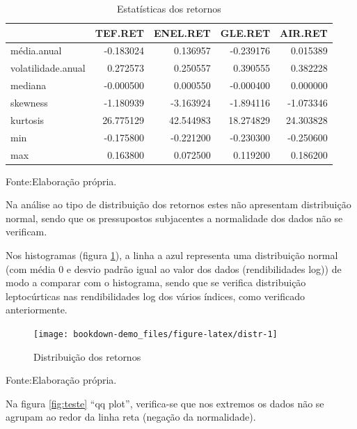\documentclass[
  12pt,
  a4paper,
  openany]{book}
\begin{document}
\begin{table}[!h]

\caption{\label{tab:statret}Estatísticas dos retornos}
\centering
\begin{tabular}[t]{lrrrr}
\toprule
  & TEF.RET & ENEL.RET & GLE.RET & AIR.RET\\
\midrule
média.anual & -0.183024 & 0.136957 & -0.239176 & 0.015389\\
volatilidade.anual & 0.272573 & 0.250557 & 0.390555 & 0.382228\\
mediana & -0.000500 & 0.000550 & -0.000400 & 0.000000\\
skewness & -1.180939 & -3.163924 & -1.894116 & -1.073346\\
kurtosis & 26.775129 & 42.544983 & 18.274829 & 24.303828\\
\addlinespace
min & -0.175800 & -0.221200 & -0.230300 & -0.250600\\
max & 0.163800 & 0.072500 & 0.119200 & 0.186200\\
\bottomrule
\end{tabular}
\end{table}
\FloatBarrier
\centering

Fonte:Elaboração própria.

\justifying
\bigskip

Na análise ao tipo de distribuição dos retornos estes não apresentam distribuição normal, sendo que os pressupostos subjacentes a normalidade dos dados não se verificam.

Nos histogramas (figura \ref{fig:distr}), a linha a azul representa uma distribuição normal (com média 0 e desvio padrão igual ao valor dos dados (rendibilidades log)) de modo a comparar com o histograma, sendo que se verifica distribuição leptocúrticas nas rendibilidades log dos vários índices, como verificado anteriormente.

\begin{figure}

{\centering \texttt{[image: bookdown-demo\_files/figure-latex/distr-1]} 

}

\caption{Distribuição dos retornos}\label{fig:distr}
\end{figure}
\FloatBarrier
\centering

Fonte:Elaboração própria.

\justifying

Na figura \ref{fig:teste} ``qq plot'', verifica-se que nos extremos os dados não se agrupam ao redor da linha reta (negação da normalidade).
\end{document}
